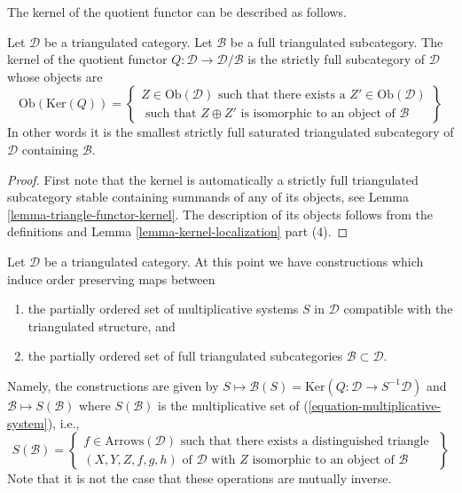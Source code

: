 \noindent
The kernel of the quotient functor can be described as follows.

\begin{lemma}
\label{lemma-kernel-quotient}
Let $\mathcal{D}$ be a triangulated category.
Let $\mathcal{B}$ be a full triangulated subcategory.
The kernel of the quotient functor
$Q : \mathcal{D} \to \mathcal{D}/\mathcal{B}$
is the strictly full subcategory of $\mathcal{D}$ whose objects are
$$
\text{Ob}(\text{Ker}(Q)) =
\left\{
\begin{matrix}
Z \in \text{Ob}(\mathcal{D})
\text{ such that there exists a }Z' \in \text{Ob}(\mathcal{D}) \\
\text{ such that }Z \oplus Z'\text{ is isomorphic to an object of }\mathcal{B}
\end{matrix}
\right\}
$$
In other words it is the smallest strictly full saturated triangulated
subcategory of $\mathcal{D}$ containing $\mathcal{B}$.
\end{lemma}

\begin{proof}
First note that the kernel is automatically a strictly full
triangulated subcategory stable containing summands of any of its objects, see
Lemma \ref{lemma-triangle-functor-kernel}.
The description of its objects follows from the definitions and
Lemma \ref{lemma-kernel-localization} part (4).
\end{proof}

\noindent
Let $\mathcal{D}$ be a triangulated category.
At this point we have constructions which induce order
preserving maps between
\begin{enumerate}
\item the partially ordered set of multiplicative systems $S$ in $\mathcal{D}$
compatible with the triangulated structure, and
\item the partially ordered set of full triangulated subcategories
$\mathcal{B} \subset \mathcal{D}$.
\end{enumerate}
Namely, the constructions are given by
$S \mapsto \mathcal{B}(S) = \text{Ker}(Q : \mathcal{D} \to S^{-1}\mathcal{D})$
and $\mathcal{B} \mapsto S(\mathcal{B})$
where $S(\mathcal{B})$ is the multiplicative set of
(\ref{equation-multiplicative-system}), i.e.,
$$
S(\mathcal{B}) =
\left\{
\begin{matrix}
f \in \text{Arrows}(\mathcal{D})
\text{ such that there exists a distinguished triangle }\\
(X, Y, Z, f, g, h) \text{ of }\mathcal{D}\text{ with }
Z\text{ isomorphic to an object of }\mathcal{B}
\end{matrix}
\right\}
$$
Note that it is not the case that these operations are mutually inverse.

